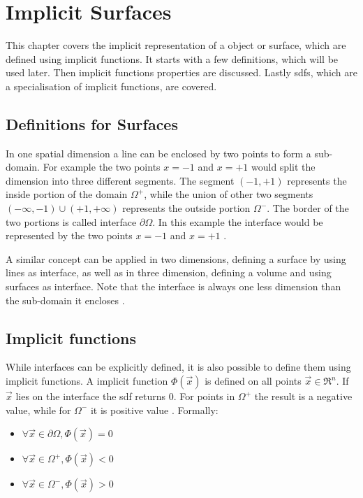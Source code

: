 \section{Implicit Surfaces}
This chapter covers the implicit representation of a object or surface, which are defined using implicit functions. It starts with a few definitions, which will be used later. Then implicit functions properties are discussed. Lastly \glspl{sdf}, which are a specialisation of implicit functions, are covered.

\subsection{Definitions for Surfaces}

In one spatial dimension a line can be enclosed by two points to form a sub-domain. For example the two points $x = -1$ and $x = +1$ would split the dimension into three different segments. The segment $(-1, +1)$ represents the inside portion of the domain $\Omega^+$, while the union of other two segments  $(-\infty,-1) \cup (+1,+\infty) $ represents the outside portion $\Omega^-$. The border of the two portions is called interface  $\partial\Omega$. In this example the interface would be represented by the two points $x = -1$ and $x = +1$ \cite{osher:2006:level}.

A similar concept can be applied in two dimensions, defining a surface by using lines as interface, as well as in three dimension, defining a volume and using surfaces as interface. Note that the interface is always one less dimension than the sub-domain it encloses \cite{osher:2006:level}.

\subsection{Implicit functions}

While interfaces can be explicitly defined, it is also possible to define them using implicit functions. A implicit function $\Phi(\vec{x})$ is defined on all points $\vec{x} \in \Re^n$. If $\vec{x}$ lies on the interface the \gls{sdf} returns 0. For points in $\Omega^+$ the result is a negative value, while for $\Omega^-$ it is positive value \cite{osher:2006:level}. Formally:
\begin{itemize}
	\item $\forall \vec{x} \in \partial\Omega,  \Phi(\vec{x}) = 0$ 
	\item $\forall \vec{x} \in \Omega^+,  \Phi(\vec{x}) < 0$
	\item $\forall \vec{x} \in \Omega^-,  \Phi(\vec{x}) > 0$
\end{itemize}

